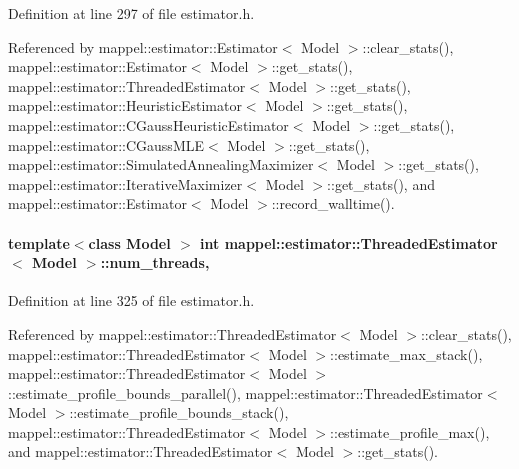 Definition at line 297 of file estimator.\+h.



Referenced by mappel\+::estimator\+::\+Estimator$<$ Model $>$\+::clear\+\_\+stats(), mappel\+::estimator\+::\+Estimator$<$ Model $>$\+::get\+\_\+stats(), mappel\+::estimator\+::\+Threaded\+Estimator$<$ Model $>$\+::get\+\_\+stats(), mappel\+::estimator\+::\+Heuristic\+Estimator$<$ Model $>$\+::get\+\_\+stats(), mappel\+::estimator\+::\+C\+Gauss\+Heuristic\+Estimator$<$ Model $>$\+::get\+\_\+stats(), mappel\+::estimator\+::\+C\+Gauss\+M\+L\+E$<$ Model $>$\+::get\+\_\+stats(), mappel\+::estimator\+::\+Simulated\+Annealing\+Maximizer$<$ Model $>$\+::get\+\_\+stats(), mappel\+::estimator\+::\+Iterative\+Maximizer$<$ Model $>$\+::get\+\_\+stats(), and mappel\+::estimator\+::\+Estimator$<$ Model $>$\+::record\+\_\+walltime().

\paragraph[{\texorpdfstring{num\+\_\+threads}{num_threads}}]{\setlength{\rightskip}{0pt plus 5cm}template$<$class Model $>$ int {\bf mappel\+::estimator\+::\+Threaded\+Estimator}$<$ Model $>$\+::num\+\_\+threads\hspace{0.3cm}{\ttfamily [protected]}, {\ttfamily [inherited]}}\hypertarget{classmappel_1_1estimator_1_1ThreadedEstimator_af746a83929a7217b4084d0e10f850bc3}{}\label{classmappel_1_1estimator_1_1ThreadedEstimator_af746a83929a7217b4084d0e10f850bc3}


Definition at line 325 of file estimator.\+h.



Referenced by mappel\+::estimator\+::\+Threaded\+Estimator$<$ Model $>$\+::clear\+\_\+stats(), mappel\+::estimator\+::\+Threaded\+Estimator$<$ Model $>$\+::estimate\+\_\+max\+\_\+stack(), mappel\+::estimator\+::\+Threaded\+Estimator$<$ Model $>$\+::estimate\+\_\+profile\+\_\+bounds\+\_\+parallel(), mappel\+::estimator\+::\+Threaded\+Estimator$<$ Model $>$\+::estimate\+\_\+profile\+\_\+bounds\+\_\+stack(), mappel\+::estimator\+::\+Threaded\+Estimator$<$ Model $>$\+::estimate\+\_\+profile\+\_\+max(), and mappel\+::estimator\+::\+Threaded\+Estimator$<$ Model $>$\+::get\+\_\+stats().

